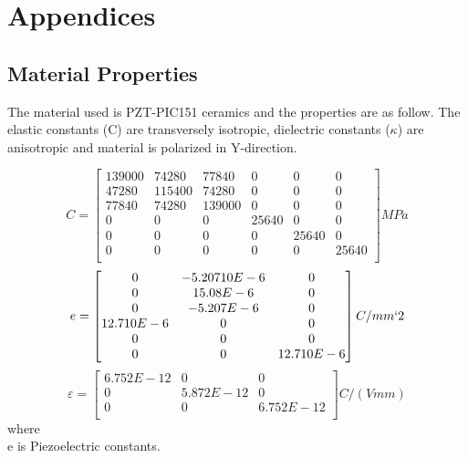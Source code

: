 \documentclass[11pt]{article}
\begin{document}
\section{Appendices}

\subsection{Material Properties} \label{MaterialProps}
The material used is
PZT-PIC151 ceramics and the properties \cite{kozinov2018simulation} are as follow. The elastic constants (C) are transversely isotropic, dielectric constants ($\kappa$) are anisotropic and material is polarized in Y-direction. 

$$
C = \begin{bmatrix}
139000 & 74280 & 77840 & 0 & 0 & 0\\
47280 & 115400 & 74280 & 0 & 0 & 0\\
77840 & 74280 & 139000 & 0 & 0 & 0\\
0 & 0 & 0 & 25640 & 0 & 0\\
0 & 0 & 0 & 0 & 25640 & 0\\
0 & 0 & 0 & 0 & 0 & 25640\\
\end{bmatrix} MPa
$$  
$$
e = \begin{bmatrix}
0 & -5.20710E-6 & 0 \\
0 & 15.08E-6 & 0 \\
0 & -5.207E-6 & 0\\
12.710E-6 & 0 & 0 \\
0 & 0 & 0 \\
0 & 0 & 12.710E-6 \\
\end{bmatrix} C/ mm`2
$$
$$
\varepsilon = \begin{bmatrix}
6.752E-12 & 0 & 0 \\
0 & 5.872E-12 & 0 \\
0 & 0 & 6.752E-12\\
\end{bmatrix} C/(V mm)
$$
where \\
e is Piezoelectric constants.








\noindent

 
\end{document}

